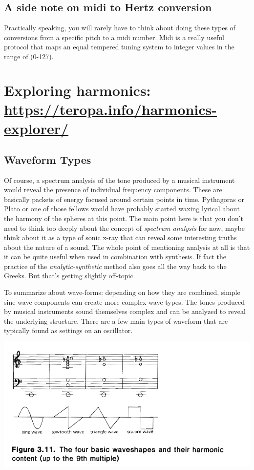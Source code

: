 \documentclass[11pt]{article}
\begin{document}
\subsection{A side note on midi to Hertz conversion}
\label{sec:orgd3bc3dc}
Practically speaking, you will rarely have to think about doing these
types of conversions from a specific pitch to a midi number. Midi is a
really useful protocol that maps an equal tempered tuning system to
integer values in the range of (0-127).


\section{Exploring harmonics: \url{https://teropa.info/harmonics-explorer/}}
\label{sec:orgcac19c9}

\subsection{Waveform Types}
\label{sec:orge06afa2}
Of course, a spectrum analysis of the tone produced by a musical
instrument would reveal the presence of individual frequency
components. These are basically packets of energy focused around
certain points in time. Pythagoras or Plato or one of those fellows
would have probably started waxing lyrical about the harmony of the
spheres at this point. 
The main point here is that you don't need to think too deeply about
the concept of \emph{spectrum analysis} for now, maybe think about it as a
type of sonic x-ray that can reveal some interesting truths about the
nature of a sound. 
The whole point of mentioning analysis at all is that it can be quite
useful when used in combination with synthesis. If fact the practice
of the \emph{analytic-synthetic} method also goes all the way back to the
Greeks. But that's getting slightly off-topic.   

To summarize about wave-forms: depending on how they are combined,
simple sine-wave components can create more complex wave types. The
tones produced by musical instruments sound themselves complex and can
be analyzed to reveal the underlying structure. There are a few main
types of waveform that are typically found as settings on an oscillator.

\begin{center}
\includegraphics[width=.9\linewidth]{./images/waveforms.png}
\end{center}
\end{document}
